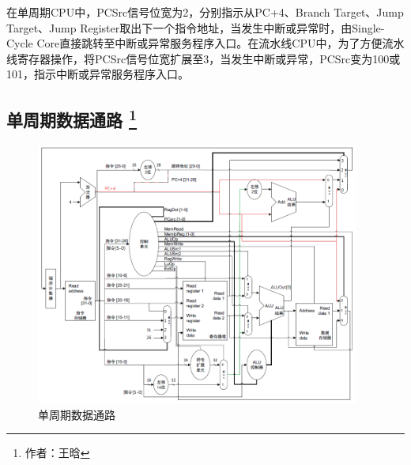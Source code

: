\documentclass{article}
\begin{document}
            在单周期CPU中，PCSrc信号位宽为2，分别指示从PC+4、Branch Target、Jump Target、Jump Register取出下一个指令地址，当发生中断或异常时，由Single-Cycle Core直接跳转至中断或异常服务程序入口。在流水线CPU中，为了方便流水线寄存器操作，将PCSrc信号位宽扩展至3，当发生中断或异常，PCSrc变为100或101，指示中断或异常服务程序入口。

        \subsection{单周期数据通路 \protect\footnote{作者：王晗}}
            \begin{figure}[H]
                \centering
                \includegraphics[width=0.95\textwidth]{images/singlecycle_datapath.png}
                \caption{\label{fig:singlecycle_datapath}单周期数据通路}
            \end{figure}
            
\end{document}

